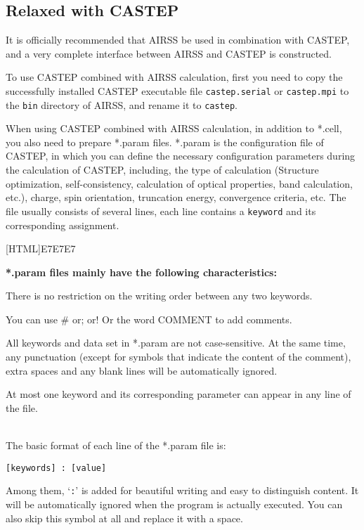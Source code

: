 \documentclass[a4paper, 10pt]{article}
\begin{document}
\subsection{Relaxed with CASTEP}
It is officially recommended that AIRSS be used in combination with CASTEP, and a very complete interface between AIRSS and CASTEP is constructed.

To use CASTEP combined with AIRSS calculation, first you need to copy the successfully installed CASTEP executable file \verb|castep.serial| or \verb|castep.mpi| to the \verb|bin| directory of AIRSS, and rename it to \verb|castep|.

When using CASTEP combined with AIRSS calculation, in addition to *.cell, you also need to prepare *.param files. *.param is the configuration file of CASTEP, in which you can define the necessary configuration parameters during the calculation of CASTEP, including, the type of calculation (Structure optimization, self-consistency, calculation of optical properties, band calculation, etc.), charge, spin orientation, truncation energy, convergence criteria, etc. The file usually consists of several lines, each line contains a \verb|keyword| and its corresponding assignment.

\noindent{}[HTML]{E7E7E7}{\parbox{\textwidth}{%
\noindent \textbf{*.param files mainly have the following characteristics:}
\begin{maineu}
\item There is no restriction on the writing order between any two keywords.
\item You can use \# or; or! Or the word COMMENT to add comments.
\item All keywords and data set in *.param are not case-sensitive. At the same time, any punctuation (except for symbols that indicate the content of the comment), extra spaces and any blank lines will be automatically ignored.
\item At most one keyword and its corresponding parameter can appear in any line of the file.
\end{maineu}}}\\

The basic format of each line of the *.param file is:
\begin{lstlisting}
[keywords] : [value]
\end{lstlisting}
Among them, `\verb|:|' is added for beautiful writing and easy to distinguish content. It will be automatically ignored when the program is actually executed. You can also skip this symbol at all and replace it with a space.
\end{document}
